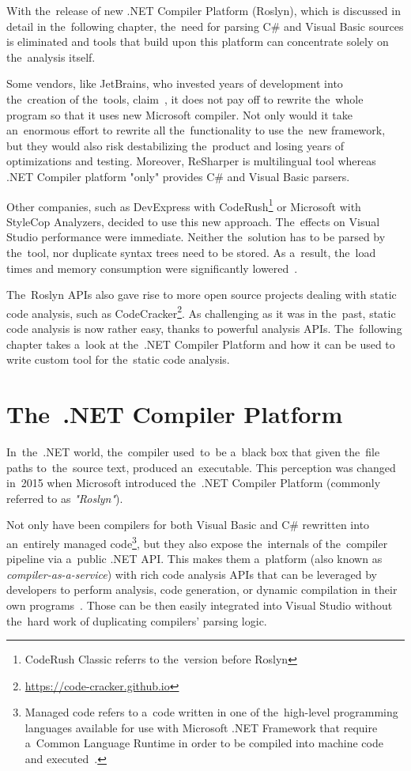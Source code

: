 \documentclass[
  digital, %
  table,   %
  lof,     %
  lot,     %
  oneside,
]{fithesis3}
\begin{document}
With the~release of new .NET Compiler Platform (Roslyn), which is discussed in detail in the~following chapter, the~need for parsing C\# and Visual Basic sources is eliminated and tools that build upon this platform can concentrate solely on the~analysis itself.

Some vendors, like JetBrains, who invested years of development into the~creation of the~tools, claim~\cite{resharper-and-roslyn-qa}, it does not pay off to rewrite the~whole program so that it uses new Microsoft compiler. Not only would it take an~enormous effort to rewrite all the~functionality to use the~new framework, but they would also risk destabilizing the~product and losing years of optimizations and testing. Moreover, ReSharper is multilingual tool whereas .NET Compiler platform "only" provides C\# and Visual Basic parsers.

Other companies, such as DevExpress with CodeRush\footnote{CodeRush Classic referrs to the~version before Roslyn} or Microsoft with StyleCop Analyzers, decided to use this new approach. The~effects on Visual Studio performance were immediate. Neither the~solution has to be parsed by the~tool, nor duplicate syntax trees need to be stored. As a~result, the~load times and memory consumption were significantly lowered~\cite{coderush-performance}.

The~Roslyn APIs also gave rise to more open source projects dealing with static code analysis, such as CodeCracker\footnote{\url{https://code-cracker.github.io}}. As challenging as it was in the~past, static code analysis is now rather easy, thanks to powerful analysis APIs. The~following chapter takes a~look at the~.NET Compiler Platform and how it can be used to write custom tool for the~static code analysis.

\chapter{The~.NET Compiler Platform}
In~the~.NET world, the~compiler used~to~be a~black box that given the~file paths to~the~source text, produced an~executable. This perception was changed in~2015 when Microsoft introduced the~.NET Compiler Platform (commonly referred to as \textit{"Roslyn"}).

Not only have been compilers for both Visual Basic and C\# rewritten into an~entirely managed code\footnote{Managed code refers to a~code written in one of the~high-level programming languages available for use with Microsoft .NET Framework that require a~Common Language Runtime in order to be compiled into machine code and executed~\cite{managed-code-microsoft}.}, but they also expose the~internals of the~compiler pipeline via a~public .NET API. This makes them a~platform (also known as \textit{compiler-as-a-service}) with rich code analysis APIs that can be leveraged by developers to perform analysis, code generation, or dynamic compilation in their own programs~\cite{roslyn-succinctly}. Those can be then easily integrated into Visual Studio without the~hard work of duplicating compilers' parsing logic.
\end{document}
